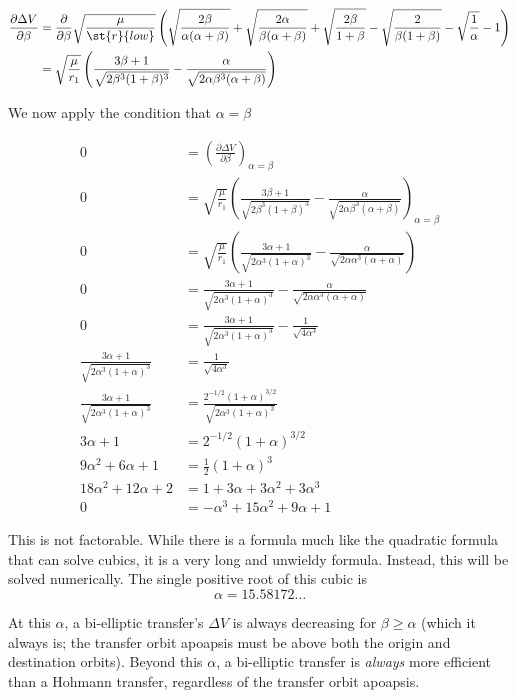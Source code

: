 \documentclass[../basicOrbitalDynamics.tex]{subfiles}
\begin{document}
\begin{align*}
    \frac{\partial\Delta V}{\partial\beta}&= \frac{\partial}{\partial\beta}\sqrt{\frac{\mu}{\st{r}{low}}}\left(\sqrt{\frac{2\beta}{\alpha(\alpha+\beta)}}+\sqrt{\frac{2\alpha}{\beta(\alpha+\beta)}}+\sqrt{\frac{2\beta}{1+\beta}}-\sqrt{\frac{2}{\beta(1+\beta)}}-\sqrt{\frac{1}{\alpha}}-1\right) \\
    &= \sqrt{\frac{\mu}{r_1}}\left(\frac{3\beta+1}{\sqrt{2\beta^3(1+\beta)^3}}-\frac{\alpha}{\sqrt{2\alpha\beta^3(\alpha+\beta)}}\right)
\end{align*}

We now apply the condition that $\alpha=\beta$

\begin{align*}
    0 &= \left(\frac{\partial\Delta V}{\partial\beta}\right)_{\alpha=\beta} \\
    0 &= \sqrt{\frac{\mu}{r_1}}\left(\frac{3\beta+1}{\sqrt{2\beta^3(1+\beta)^3}}-\frac{\alpha}{\sqrt{2\alpha\beta^3(\alpha+\beta)}}\right)_{\alpha=\beta} \\
    0 &=\sqrt{\frac{\mu}{r_1}}\left(\frac{3\alpha+1}{\sqrt{2\alpha^3(1+\alpha)^3}}-\frac{\alpha}{\sqrt{2\alpha\alpha^3(\alpha+\alpha)}}\right) \\
    0 &=\frac{3\alpha+1}{\sqrt{2\alpha^3(1+\alpha)^3}}-\frac{\alpha}{\sqrt{2\alpha\alpha^3(\alpha+\alpha)}} \\
    0 &=\frac{3\alpha+1}{\sqrt{2\alpha^3(1+\alpha)^3}}-\frac{1}{\sqrt{4\alpha^3}} \\
    \frac{3\alpha+1}{\sqrt{2\alpha^3(1+\alpha)^3}} &=\frac{1}{\sqrt{4\alpha^3}} \\
    \frac{3\alpha+1}{\sqrt{2\alpha^3(1+\alpha)^3}} &=\frac{2^{-1/2}(1+\alpha)^{3/2}}{\sqrt{2\alpha^3(1+\alpha)^3}} \\
    3\alpha+1&=2^{-1/2}(1+\alpha)^{3/2} \\
    9\alpha^2+6\alpha+1&=\frac{1}{2}(1+\alpha)^3 \\
    18\alpha^2+12\alpha+2 &=1+3\alpha+3\alpha^2+3\alpha^3 \\
    0 &=-\alpha^3+15\alpha^2+9\alpha+1
\end{align*}

This is not factorable. While there is a formula much like the quadratic formula that can solve cubics, it is a very long and unwieldy formula. Instead, this will be solved numerically. The single positive root of this cubic is
$$\alpha=15.58172\dots$$

At this $\alpha$, a bi-elliptic transfer's $\Delta V$ is always decreasing for $\beta\geq\alpha$ (which it always is; the transfer orbit apoapsis must be above both the origin and destination orbits). Beyond this $\alpha$, a bi-elliptic transfer is \textit{always} more efficient than a Hohmann transfer, regardless of the transfer orbit apoapsis.
\end{document}
